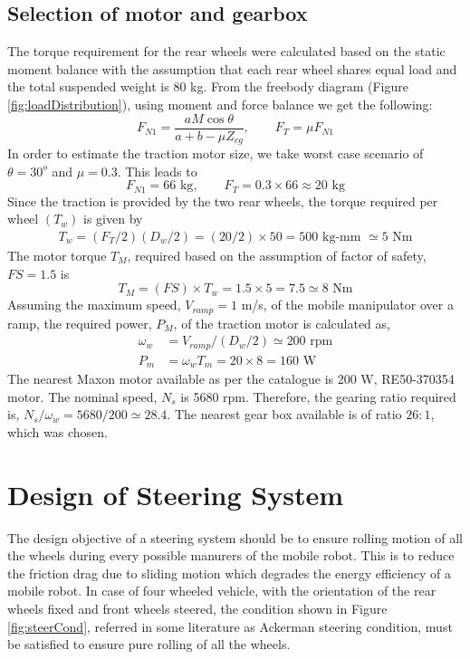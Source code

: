  \subsection {Selection of motor and gearbox}
 The torque requirement for the rear wheels were calculated based on the static moment balance with the assumption that each rear wheel shares equal load and the total suspended weight is 80 kg. From the freebody diagram (Figure   \ref{fig:loadDistribution}), using moment and force balance  we get the following:
\begin{equation}
\label{eqn:t1}
F_{N1}=\frac{a M \cos \theta}{a+b-\mu Z_{cg}} , \quad \quad
F_T=\mu F_{N1}
\end{equation}
In order to estimate the traction motor size, we take worst case scenario of $\theta=30^o$ and $\mu =0.3$. This leads to
\begin{equation*}
F_{N1}=66 \text{ kg}, \quad\quad F_T=0.3\times 66 \approx 20 \text{ kg}
\end{equation*}
 Since the traction is provided by the two rear wheels, the torque required per wheel $(T_w)$ is given by
\begin{eqnarray}
T_w=(F_T/2)(D_w/2)= (20/2) \times 50=500 \text{ kg-mm } \simeq 5 \text{ Nm}
\end{eqnarray}
The motor torque $T_M$, required based on the assumption of factor of safety, $FS=1.5$ is
\begin{equation}
T_M=(FS)\times T_w=1.5\times 5 =7.5 \simeq 8 \text{ Nm}
\end{equation}
 Assuming the maximum speed, $V_{ramp}=1$ m/s, of the mobile manipulator over a ramp, the required power, $P_M$, of the traction motor is calculated as,
 \begin{equation}
 \begin{aligned}
\omega_w&=V_{ramp}/(D_w/2) \simeq 200 \text{ rpm}\\
P_m&=\omega_w T_m=20\times 8=160 \text{ W}
 \end{aligned}
 \end{equation}
 The nearest Maxon motor available as per the catalogue \cite{catMaxon} is 200 W,  RE50-370354 motor.  The nominal speed, $N_s$ is 5680 rpm. Therefore, the  gearing  ratio required is, $N_s/\omega_w=5680/200 \simeq 28.4$. The nearest gear box available  is of ratio $26:1$, which was chosen. 

\section{Design of Steering System }
The design objective of a steering system should be to ensure rolling motion of all the  wheels during every possible manurers of the mobile robot. This is  to reduce the friction drag due to sliding motion which degrades the energy efficiency of a mobile robot. In case of four wheeled vehicle, with the orientation of the rear wheels fixed and front wheels steered, the condition   shown in Figure \ref{fig:steerCond},  referred in some literature as Ackerman steering condition, must be satisfied to ensure pure rolling of all the wheels.   

